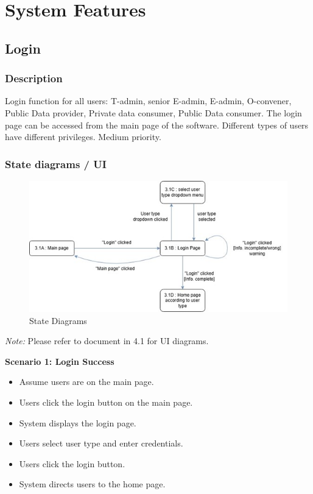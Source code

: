 \chapter{System Features}

\section{Login}

\subsection{Description}
Login function for all users: T-admin, senior E-admin, E-admin, O-convener, Public Data provider, Private data consumer, Public Data consumer. The login page can be accessed from the main page of the software. Different types of users have different privileges. Medium priority.

\subsection{State diagrams / UI}
\begin{figure}[H]
    \centering
    \includegraphics[width=0.75\linewidth]{picture/picture312.jpg}
    \caption{State Diagrams}
    \label{fig:enter-label}
\end{figure}

\textit{Note:} Please refer to document in 4.1 for UI diagrams.

\textbf{Scenario 1: Login Success}
\begin{itemize}
    \item Assume users are on the main page.
    \item Users click the login button on the main page.
    \item System displays the login page.
    \item Users select user type and enter credentials.
    \item Users click the login button.
    \item System directs users to the home page.
\end{itemize}

